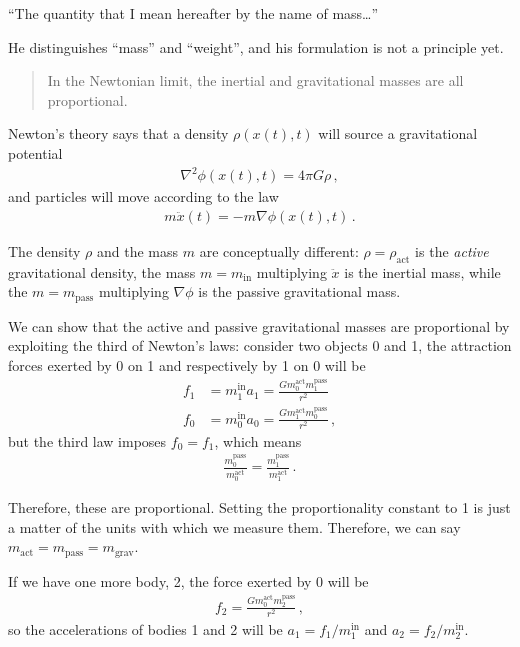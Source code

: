 \documentclass[main.tex]{subfiles}
\begin{document}
``The quantity that I mean hereafter by the name of mass\dots''

He distinguishes ``mass'' and ``weight'', and his formulation is not a principle yet. 

\begin{quotation}
In the Newtonian limit, the inertial and gravitational masses are all proportional. 
\end{quotation}

Newton's theory says that a density \(\rho (x(t), t)\) will source a gravitational potential 
%
\begin{align}
\nabla^2 \phi (x(t), t) = 4 \pi G \rho 
\,,
\end{align}
%
and particles will move according to the law 
%
\begin{align}
m \ddot{x} (t) = - m \nabla \phi (x(t), t)
\,.
\end{align}

The density \(\rho \) and the mass \(m\) are conceptually different: \(\rho = \rho _{\text{act}}\) is the \emph{active} gravitational density, the mass \(m = m _{\text{in}}\) multiplying \(\ddot{x}\) is the inertial mass, while the \(m = m _{\text{pass}}\) multiplying \(\nabla \phi \) is the passive gravitational mass. 

We can show that the active and passive gravitational masses are proportional by exploiting the third of Newton's laws: consider two objects 0 and 1, the attraction forces exerted by 0 on 1 and respectively by 1 on 0 will be 
%
\begin{subequations}
\begin{align}
f_1 &= m_1^{\text{in}} a_1 = \frac{G m_0^{\text{act}} m_1^{\text{pass}}}{r^2} \\
f_0 &= m_0^{\text{in}} a_0 = \frac{G m_1^{\text{act}} m_0^{\text{pass}}}{r^2}
\,,
\end{align}
\end{subequations}
%
but the third law imposes \(f_0 = f_1 \), which means 
%
\begin{align}
\frac{m_0^{\text{pass}}}{m_0^{\text{act}}} =
\frac{m_1^{\text{pass}}}{m_1^{\text{act}}}
\,.
\end{align}

Therefore, these are proportional. 
Setting the proportionality constant to 1 is just a matter of the units with which we measure them.
Therefore, we can say \(m _{\text{act}} = m _{\text{pass}} = m _{\text{grav}}\). 

If we have one more body, 2, the force exerted by 0 will be 
%
\begin{align}
f_2 = \frac{G m_0^{\text{act}} m_2^{\text{pass}}}{r^2}
\,,
\end{align}
%
so the accelerations of bodies 1 and 2 will be \(a_1 = f_1 / m_1^{\text{in}}\) and \(a_2 = f_2 / m_2^{\text{in}}\).
\end{document}
